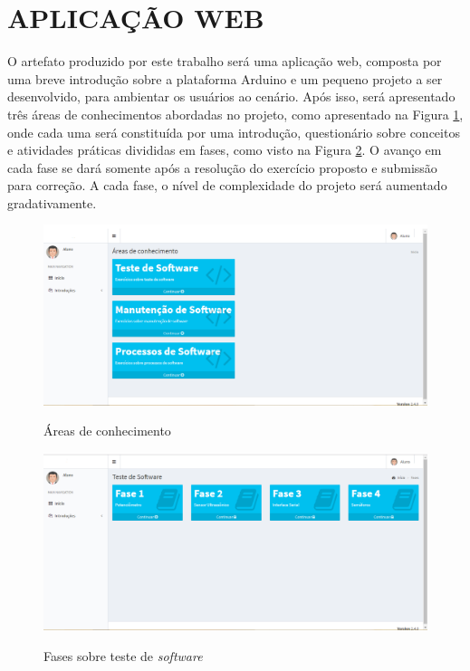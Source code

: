 \section{APLICAÇÃO WEB}
\label{sec:desenvApp}



O artefato produzido por este trabalho será uma aplicação web, composta por uma breve introdução sobre a plataforma Arduino e um pequeno projeto a ser desenvolvido, para ambientar os usuários ao cenário. Após isso, será apresentado três áreas de conhecimentos abordadas no projeto, como apresentado na Figura \ref{fig:figura-areas-telas}, onde cada uma será constituída por uma introdução, questionário sobre conceitos e atividades práticas divididas em fases, como visto na Figura \ref{fig:figura-fases-telas}. O avanço em cada fase se dará somente após a resolução do exercício proposto e submissão para correção. A cada fase, o nível de complexidade do projeto será aumentado gradativamente.

\begin{figure}[!htb]
    \centering
    \caption{Áreas de conhecimento}
    \includegraphics[width=1\textwidth]{./dados/figuras/areasTela}
    \label{fig:figura-areas-telas}
\end{figure}

\begin{figure}[!htb]
    \centering
    \caption{Fases sobre teste de \textit{software}}
    \includegraphics[width=1\textwidth]{./dados/figuras/fasesTela}
    \label{fig:figura-fases-telas}
\end{figure}
 
